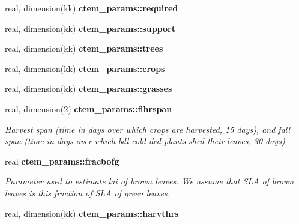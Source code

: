 \begin{DoxyCompactItemize}
\item 
\hypertarget{namespacectem__params_a775996520ca2eee2cc4b055dc8be4bf6}{}real, dimension(kk) {\bfseries ctem\+\_\+params\+::required}\label{namespacectem__params_a775996520ca2eee2cc4b055dc8be4bf6}

\item 
\hypertarget{namespacectem__params_a6aa3f3878deae1b1ea4eb4ad5f6f490a}{}real, dimension(kk) {\bfseries ctem\+\_\+params\+::support}\label{namespacectem__params_a6aa3f3878deae1b1ea4eb4ad5f6f490a}

\item 
\hypertarget{namespacectem__params_aad8cd32e949b5c0f5c14c0fc0d4fb81a}{}real, dimension(kk) {\bfseries ctem\+\_\+params\+::trees}\label{namespacectem__params_aad8cd32e949b5c0f5c14c0fc0d4fb81a}

\item 
\hypertarget{namespacectem__params_a30ad6fa95c7608b3d63d672de5dc7e79}{}real, dimension(kk) {\bfseries ctem\+\_\+params\+::crops}\label{namespacectem__params_a30ad6fa95c7608b3d63d672de5dc7e79}

\item 
\hypertarget{namespacectem__params_a83f90ad8a56a462e318c2921eda3db4a}{}real, dimension(kk) {\bfseries ctem\+\_\+params\+::grasses}\label{namespacectem__params_a83f90ad8a56a462e318c2921eda3db4a}

\item 
\hypertarget{namespacectem__params_a766b351a6a0cf14bfa75068e43a300da}{}real, dimension(2) {\bfseries ctem\+\_\+params\+::flhrspan}\label{namespacectem__params_a766b351a6a0cf14bfa75068e43a300da}

\begin{DoxyCompactList}\small\item\em Harvest span (time in days over which crops are harvested, 15 days), and fall span (time in days over which bdl cold dcd plants shed their leaves, 30 days) \end{DoxyCompactList}\item 
\hypertarget{namespacectem__params_a220bfc3b9a9be5d41edb3eda82a2988e}{}real {\bfseries ctem\+\_\+params\+::fracbofg}\label{namespacectem__params_a220bfc3b9a9be5d41edb3eda82a2988e}

\begin{DoxyCompactList}\small\item\em Parameter used to estimate lai of brown leaves. We assume that S\+L\+A of brown leaves is this fraction of S\+L\+A of green leaves. \end{DoxyCompactList}\item 
\hypertarget{namespacectem__params_a3692335bc09fe9876e4054a0658982ff}{}real, dimension(kk) {\bfseries ctem\+\_\+params\+::harvthrs}\label{namespacectem__params_a3692335bc09fe9876e4054a0658982ff}


\end{DoxyCompactItemize}
